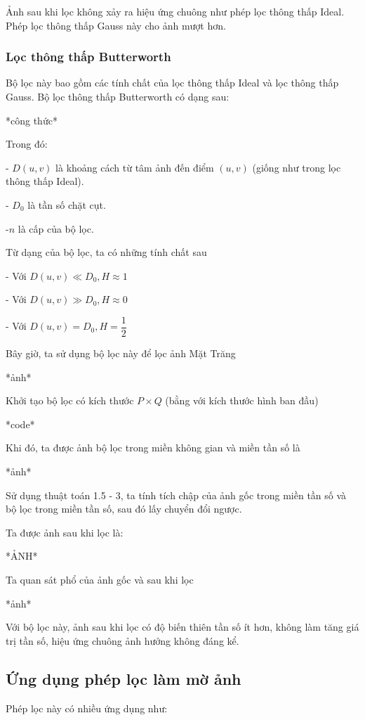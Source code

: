 \documentclass[12pt,a4paper]{report}
\numberwithin{equation}{section}
\theoremstyle{definition} %
\begin{document}
Ảnh sau khi lọc không xảy ra hiệu ứng chuông như phép lọc thông thấp Ideal. Phép lọc thông thấp Gauss này cho ảnh mượt hơn.
\subsubsection{Lọc thông thấp Butterworth}

Bộ lọc này bao gồm các tính chất của lọc thông thấp Ideal và lọc thông thấp Gauss. Bộ lọc thông thấp Butterworth có dạng sau:

*công thức*


Trong đó:

- $D(u,v)$ là khoảng cách từ tâm ảnh đến điểm $(u,v)$ (giống như trong lọc thông thấp Ideal).

- $D_0$ là tần số chặt cụt.

-$n$ là cấp của bộ lọc.

Từ dạng của bộ lọc, ta có những tính chất sau

- Với $D(u,v) \ll D_0, H\approx 1$

- Với $D(u,v) \gg D_0, H\approx 0$

- Với $D(u,v) = D_0, H= \dfrac{1}{2}$

Bây giờ, ta sử dụng bộ lọc này để lọc ảnh Mặt Trăng

*ảnh*

Khởi tạo bộ lọc có kích thước $P \times Q$ (bằng với kích thước hình ban đầu)

*code*

Khi đó, ta được ảnh bộ lọc trong miền không gian và miền tần số là 

*ảnh*

Sử dụng thuật toán 1.5 - 3, ta tính tích chập của ảnh gốc trong miền tần số và bộ lọc trong miền tần số, sau đó lấy chuyển đổi ngược.

Ta được ảnh sau khi lọc là:

*ẢNH*

Ta quan sát phổ của ảnh gốc và sau khi lọc 

*ảnh*

Với bộ lọc này, ảnh sau khi lọc có độ biến thiên tần số ít hơn, không làm tăng giá trị tần số, hiệu ứng chuông ảnh hưởng không đáng kể. 



\subsection{Ứng dụng phép lọc làm mờ ảnh}

Phép lọc này có nhiều ứng dụng như:
\end{document}
